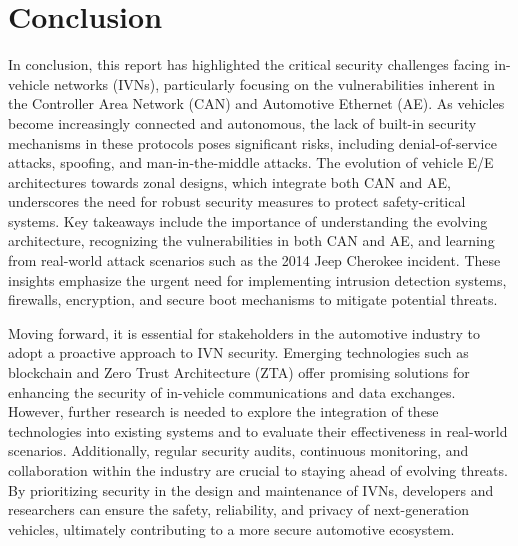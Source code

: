 \documentclass{report}
\begin{document}
\newpage
\section{Conclusion}
In conclusion, this report has highlighted the critical security challenges facing in-vehicle networks (IVNs), particularly focusing on the vulnerabilities inherent in the Controller Area Network (CAN) and Automotive Ethernet (AE). As vehicles become increasingly connected and autonomous, the lack of built-in security mechanisms in these protocols poses significant risks, including denial-of-service attacks, spoofing, and man-in-the-middle attacks. The evolution of vehicle E/E architectures towards zonal designs, which integrate both CAN and AE, underscores the need for robust security measures to protect safety-critical systems. Key takeaways include the importance of understanding the evolving architecture, recognizing the vulnerabilities in both CAN and AE, and learning from real-world attack scenarios such as the 2014 Jeep Cherokee incident. These insights emphasize the urgent need for implementing intrusion detection systems, firewalls, encryption, and secure boot mechanisms to mitigate potential threats.

Moving forward, it is essential for stakeholders in the automotive industry to adopt a proactive approach to IVN security. Emerging technologies such as blockchain and Zero Trust Architecture (ZTA) offer promising solutions for enhancing the security of in-vehicle communications and data exchanges. However, further research is needed to explore the integration of these technologies into existing systems and to evaluate their effectiveness in real-world scenarios. Additionally, regular security audits, continuous monitoring, and collaboration within the industry are crucial to staying ahead of evolving threats. By prioritizing security in the design and maintenance of IVNs, developers and researchers can ensure the safety, reliability, and privacy of next-generation vehicles, ultimately contributing to a more secure automotive ecosystem.


\newpage
 
\end{document}
